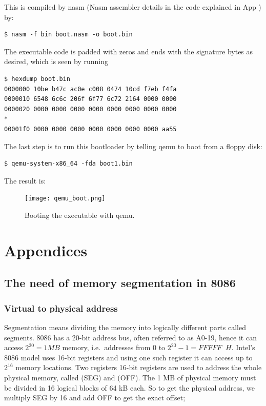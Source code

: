 \documentclass[a4paper]{article}
\begin{document}
This is compiled by nasm (Nasm assembler details in the code explained in App \TODO) by:
\begin{verbatim}
$ nasm -f bin boot.nasm -o boot.bin
\end{verbatim}
The executable code is padded with zeros and ends with the signature bytes as desired, which is seen by running 
\begin{verbatim}
$ hexdump boot.bin
0000000 10be b47c ac0e c008 0474 10cd f7eb f4fa
0000010 6548 6c6c 206f 6f77 6c72 2164 0000 0000
0000020 0000 0000 0000 0000 0000 0000 0000 0000
*
00001f0 0000 0000 0000 0000 0000 0000 0000 aa55
\end{verbatim}
The last step is to run this bootloader by telling qemu to boot from a floppy disk:
\begin{verbatim}
$ qemu-system-x86_64 -fda boot1.bin	
\end{verbatim}
The result is:
\begin{figure}[H]
	\centering
	\texttt{[image: qemu\_boot.png]}
	\caption{Booting the executable with qemu.}
\end{figure}

\newpage
\appendix

\section{Appendices}

\newpage
\subsection{The need of memory segmentation in 8086}
\label{app:segm}

\subsubsection{Virtual to physical address}
Segmentation means dividing the memory into logically different parts called segments. 8086 has a 20-bit address bus, often referred to as A0-19, hence it can access $2^{20}=1 MB$ memory, i.e.\ addresses from 0 to $2^{20}-1 = FFFFF \;\; H$. Intel's 8086 model uses 16-bit registers and using one such register it can access up to $2^{16}$ memory locations. Two registers 16-bit registers are used to address the whole physical memory, called  (SEG) and  (OFF). The 1 MB of physical memory must be divided in 16 logical blocks of 64 kB each. So to get the physical address, we multiply SEG by 16 and add OFF to get the exact offset;
\end{document}
